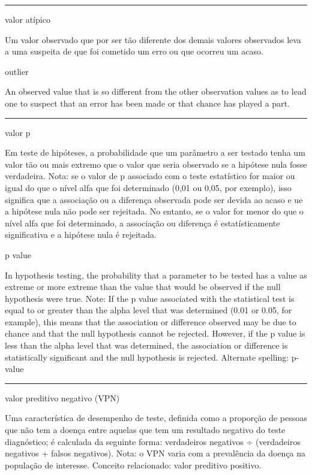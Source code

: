 \documentclass[
]{book}
\begin{document}
\begin{center}\rule{0.5\linewidth}{0.5pt}\end{center}

valor atípico

Um valor observado que por ser tão diferente dos demais valores observados leva a uma suspeita de que foi cometido um erro ou que ocorreu um acaso.

outlier

An observed value that is so different from the other observation values as to lead one to suspect that an error has been made or that chance has played a part.

\begin{center}\rule{0.5\linewidth}{0.5pt}\end{center}

valor p

Em teste de hipóteses, a probabilidade que um parâmetro a ser testado tenha um valor tão ou mais extremo que o valor que seria observado se a hipótese nula fosse verdadeira. Nota: se o valor de p associado com o teste estatístico for maior ou igual do que o nível alfa que foi determinado (0,01 ou 0,05, por exemplo), isso significa que a associação ou a diferença observada pode ser devida ao acaso e ue a hipótese nula não pode ser rejeitada. No entanto, se o valor for menor do que o nível alfa que foi determinado, a associação ou diferença é estatísticamente significativa e a hipótese nula é rejeitada.

p value

In hypothesis testing, the probability that a parameter to be tested has a value as extreme or more extreme than the value that would be observed if the null hypothesis were true. Note: If the p value associated with the statistical test is equal to or greater than the alpha level that was determined (0.01 or 0.05, for example), this means that the association or difference observed may be due to chance and that the null hypothesis cannot be rejected. However, if the p value is less than the alpha level that was determined, the association or difference is statistically significant and the null hypothesis is rejected. Alternate spelling: p-value

\begin{center}\rule{0.5\linewidth}{0.5pt}\end{center}

valor preditivo negativo (VPN)

Uma característica de desempenho de teste, definida como a proporção de pessoas que não tem a doença entre aquelas que tem um resultado negativo do teste diagnóstico; é calculada da seguinte forma: verdadeiros negativos ÷ (verdadeiros negativos + falsos negativos). Nota: o VPN varia com a prevalência da doença na população de interesse. Conceito relacionado: valor preditivo positivo.
\end{document}
